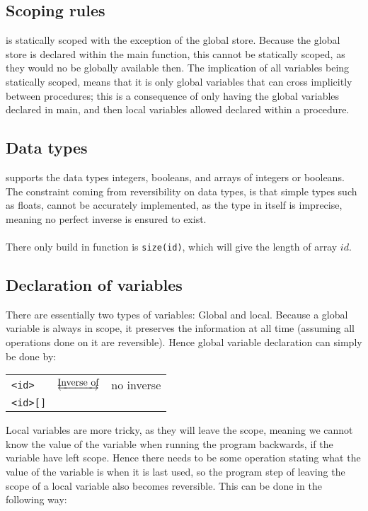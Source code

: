 \subsection{Scoping rules}
\lan is statically scoped with the exception of the global store. Because the global store is
declared within the main function, this cannot be statically scoped, as they would no be globally
available then. The implication of all variables being statically scoped, means that it is only
global variables that can cross implicitly between procedures; this is a consequence of only
having the global variables declared in main, and then local variables allowed declared within a
procedure.

\subsection{Data types}
\lan supports the data types integers, booleans, and arrays of integers or booleans.
The constraint coming from reversibility on data types, is that simple types such as floats,
cannot be accurately implemented, as the type in itself is imprecise, meaning no perfect inverse
is ensured to exist.
\\
\\
There only build in function is \texttt{size(id)}, which will give the length of array $id$.

\subsection{Declaration of variables}
There are essentially two types of variables: Global and local. Because a global variable is
always in scope, it preserves the information at all time (assuming all operations done on it
are reversible). Hence global variable declaration can simply be done by:

\begin{table*}[h]
    \centering
    \begin{tabular}{lcl}
        \texttt{<id>} & $\underleftrightarrow{\text{Inverse of}}$ & no inverse \\
        \texttt{<id>[]}
    \end{tabular}
\end{table*}
\noindent
Local variables are more tricky, as they will leave the scope, meaning we cannot know the value
of the variable when running the program backwards, if the variable have left scope. Hence there
needs to be some operation stating what the value of the variable is when it is last used, so
the program step of leaving the scope of a local variable also becomes reversible. This can be
done in the following way:

